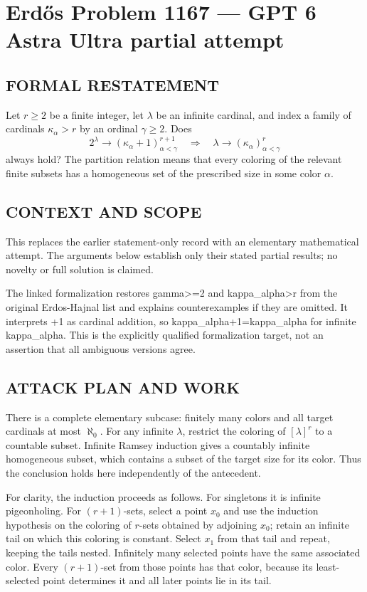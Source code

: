 \section*{Erd\H{o}s Problem 1167 --- GPT 6 Astra Ultra partial attempt}


\subsection*{FORMAL RESTATEMENT}
Let $r\geq2$ be a finite integer, let $\lambda$ be an infinite cardinal, and index a family of cardinals $\kappa_\alpha>r$ by an ordinal $\gamma\geq2$. Does
\[
2^\lambda\longrightarrow(\kappa_\alpha+1)_{\alpha<\gamma}^{r+1}
\quad\Longrightarrow\quad
\lambda\longrightarrow(\kappa_\alpha)_{\alpha<\gamma}^{r}
\]
always hold? The partition relation means that every coloring of the relevant finite subsets has a homogeneous set of the prescribed size in some color $\alpha$.

\subsection*{CONTEXT AND SCOPE}
This replaces the earlier statement-only record with an elementary mathematical attempt. The arguments below establish only their stated partial results; no novelty or full solution is claimed.

The linked formalization restores gamma>=2 and kappa_alpha>r from the original Erdos-Hajnal list and explains counterexamples if they are omitted. It interprets +1 as cardinal addition, so kappa_alpha+1=kappa_alpha for infinite kappa_alpha. This is the explicitly qualified formalization target, not an assertion that all ambiguous versions agree.

\subsection*{ATTACK PLAN AND WORK}
There is a complete elementary subcase: finitely many colors and all target
cardinals at most $\aleph_0$. For any infinite $\lambda$, restrict the coloring
of $[\lambda]^r$ to a countable subset. Infinite Ramsey induction gives a
countably infinite homogeneous subset, which contains a subset of the target
size for its color. Thus the conclusion holds here independently of the antecedent.

For clarity, the induction proceeds as follows. For singletons it is infinite
pigeonholing. For $(r+1)$-sets, select a point $x_0$ and use the induction
hypothesis on the coloring of $r$-sets obtained by adjoining $x_0$; retain an
infinite tail on which this coloring is constant. Select $x_1$ from that tail
and repeat, keeping the tails nested. Infinitely many selected points have the
same associated color. Every $(r+1)$-set from those points has that color,
because its least-selected point determines it and all later points lie in its tail.

